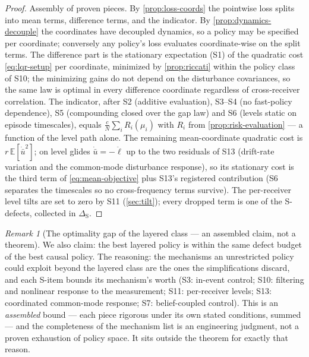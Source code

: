\documentclass[11pt, a4paper]{article}
\theoremstyle{definition}
\theoremstyle{plain}
\theoremstyle{remark}
\newtheorem{remark}{Remark}[section]
\newcommand{\E}{\mathbb{E}}
\begin{document}
\begin{proof}
Assembly of proven pieces.  By \cref{prop:loss-coords} the pointwise
loss splits into mean terms, difference terms, and the indicator.  By
\cref{prop:dynamics-decouple} the coordinates have decoupled dynamics,
so a policy may be specified per coordinate; conversely any policy's
loss evaluates coordinate-wise on the split terms.  The difference
part is the stationary expectation (S1) of the quadratic cost
\cref{eq:lqr-setup} per coordinate, minimized by \cref{prop:riccati}
within the policy class of S10; the minimizing gains do not depend on
the disturbance covariances, so the same law is optimal in every
difference coordinate regardless of cross-receiver correlation.  The
indicator, after S2 (additive evaluation), S3--S4 (no fast-policy
dependence), S5 (compounding closed over the gap law) and S6 (levels
static on episode timescales), equals
$\tfrac{c}{N}\sum_i R_i(\mu_i)$ with $R_i$ from
\cref{prop:risk-evaluation} --- a function of the level path alone.
The remaining mean-coordinate quadratic cost is
$r\,\E[\dot{\bar u}^2]$; on level glides
$\dot{\bar u} = -\ddot\ell$ up to the two residuals of S13
(drift-rate variation and the common-mode disturbance response), so
its stationary cost is the third term of \cref{eq:mean-objective}
plus S13's registered contribution (S6 separates the timescales so no
cross-frequency terms survive).  The per-receiver level tilts are set
to zero by S11 (\cref{sec:tilt}); every dropped term is one of the
S-defects, collected in $\Delta_{\mathrm{S}}$.
\end{proof}

\begin{remark}[The optimality gap of the layered class --- an
assembled claim, not a theorem]\label{rem:gap-claim}
We also claim: the best layered policy is within the same defect
budget of the best causal policy.  The reasoning: the mechanisms an
unrestricted policy could exploit beyond the layered class are the
ones the simplifications discard, and each S-item bounds its
mechanism's worth (S3: in-event control; S10: filtering and nonlinear
response to the measurement; S11: per-receiver levels; S13:
coordinated common-mode response; S7: belief-coupled control).  This
is an \emph{assembled} bound --- each piece rigorous under its own
stated conditions, summed --- and the completeness of the mechanism
list is an engineering judgment, not a proven exhaustion of policy
space.  It sits outside the theorem for exactly that reason.
\end{remark}
\end{document}
